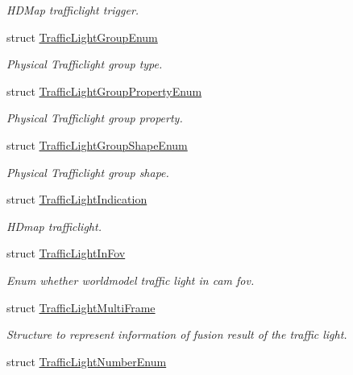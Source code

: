 \begin{DoxyCompactItemize}
\begin{DoxyCompactList}\small\item\em H\+D\+Map trafficlight trigger. \end{DoxyCompactList}\item 
struct \hyperlink{structmaf__perception__interface_1_1TrafficLightGroupEnum}{Traffic\+Light\+Group\+Enum}
\begin{DoxyCompactList}\small\item\em Physical Trafficlight group type. \end{DoxyCompactList}\item 
struct \hyperlink{structmaf__perception__interface_1_1TrafficLightGroupPropertyEnum}{Traffic\+Light\+Group\+Property\+Enum}
\begin{DoxyCompactList}\small\item\em Physical Trafficlight group property. \end{DoxyCompactList}\item 
struct \hyperlink{structmaf__perception__interface_1_1TrafficLightGroupShapeEnum}{Traffic\+Light\+Group\+Shape\+Enum}
\begin{DoxyCompactList}\small\item\em Physical Trafficlight group shape. \end{DoxyCompactList}\item 
struct \hyperlink{structmaf__perception__interface_1_1TrafficLightIndication}{Traffic\+Light\+Indication}
\begin{DoxyCompactList}\small\item\em H\+Dmap trafficlight. \end{DoxyCompactList}\item 
struct \hyperlink{structmaf__perception__interface_1_1TrafficLightInFov}{Traffic\+Light\+In\+Fov}
\begin{DoxyCompactList}\small\item\em Enum whether worldmodel traffic light in cam fov. \end{DoxyCompactList}\item 
struct \hyperlink{structmaf__perception__interface_1_1TrafficLightMultiFrame}{Traffic\+Light\+Multi\+Frame}
\begin{DoxyCompactList}\small\item\em Structure to represent information of fusion result of the traffic light. \end{DoxyCompactList}\item 
struct \hyperlink{structmaf__perception__interface_1_1TrafficLightNumberEnum}{Traffic\+Light\+Number\+Enum}

\end{DoxyCompactItemize}
